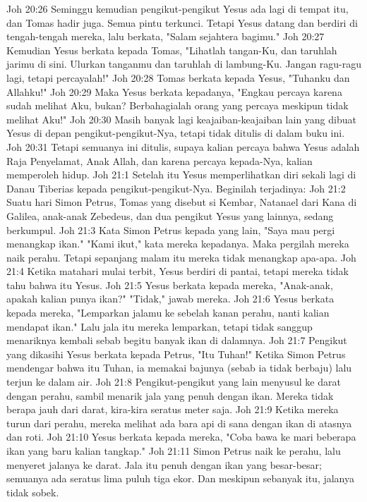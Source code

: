 Joh 20:26  Seminggu kemudian pengikut-pengikut Yesus ada lagi di tempat itu, dan Tomas hadir juga. Semua pintu terkunci. Tetapi Yesus datang dan berdiri di tengah-tengah mereka, lalu berkata, "Salam sejahtera bagimu."
Joh 20:27  Kemudian Yesus berkata kepada Tomas, "Lihatlah tangan-Ku, dan taruhlah jarimu di sini. Ulurkan tanganmu dan taruhlah di lambung-Ku. Jangan ragu-ragu lagi, tetapi percayalah!"
Joh 20:28  Tomas berkata kepada Yesus, "Tuhanku dan Allahku!"
Joh 20:29  Maka Yesus berkata kepadanya, "Engkau percaya karena sudah melihat Aku, bukan? Berbahagialah orang yang percaya meskipun tidak melihat Aku!"
Joh 20:30  Masih banyak lagi keajaiban-keajaiban lain yang dibuat Yesus di depan pengikut-pengikut-Nya, tetapi tidak ditulis di dalam buku ini.
Joh 20:31  Tetapi semuanya ini ditulis, supaya kalian percaya bahwa Yesus adalah Raja Penyelamat, Anak Allah, dan karena percaya kepada-Nya, kalian memperoleh hidup.
Joh 21:1  Setelah itu Yesus memperlihatkan diri sekali lagi di Danau Tiberias kepada pengikut-pengikut-Nya. Beginilah terjadinya:
Joh 21:2  Suatu hari Simon Petrus, Tomas yang disebut si Kembar, Natanael dari Kana di Galilea, anak-anak Zebedeus, dan dua pengikut Yesus yang lainnya, sedang berkumpul.
Joh 21:3  Kata Simon Petrus kepada yang lain, "Saya mau pergi menangkap ikan." "Kami ikut," kata mereka kepadanya. Maka pergilah mereka naik perahu. Tetapi sepanjang malam itu mereka tidak menangkap apa-apa.
Joh 21:4  Ketika matahari mulai terbit, Yesus berdiri di pantai, tetapi mereka tidak tahu bahwa itu Yesus.
Joh 21:5  Yesus berkata kepada mereka, "Anak-anak, apakah kalian punya ikan?" "Tidak," jawab mereka.
Joh 21:6  Yesus berkata kepada mereka, "Lemparkan jalamu ke sebelah kanan perahu, nanti kalian mendapat ikan." Lalu jala itu mereka lemparkan, tetapi tidak sanggup menariknya kembali sebab begitu banyak ikan di dalamnya.
Joh 21:7  Pengikut yang dikasihi Yesus berkata kepada Petrus, "Itu Tuhan!" Ketika Simon Petrus mendengar bahwa itu Tuhan, ia memakai bajunya (sebab ia tidak berbaju) lalu terjun ke dalam air.
Joh 21:8  Pengikut-pengikut yang lain menyusul ke darat dengan perahu, sambil menarik jala yang penuh dengan ikan. Mereka tidak berapa jauh dari darat, kira-kira seratus meter saja.
Joh 21:9  Ketika mereka turun dari perahu, mereka melihat ada bara api di sana dengan ikan di atasnya dan roti.
Joh 21:10  Yesus berkata kepada mereka, "Coba bawa ke mari beberapa ikan yang baru kalian tangkap."
Joh 21:11  Simon Petrus naik ke perahu, lalu menyeret jalanya ke darat. Jala itu penuh dengan ikan yang besar-besar; semuanya ada seratus lima puluh tiga ekor. Dan meskipun sebanyak itu, jalanya tidak sobek.
